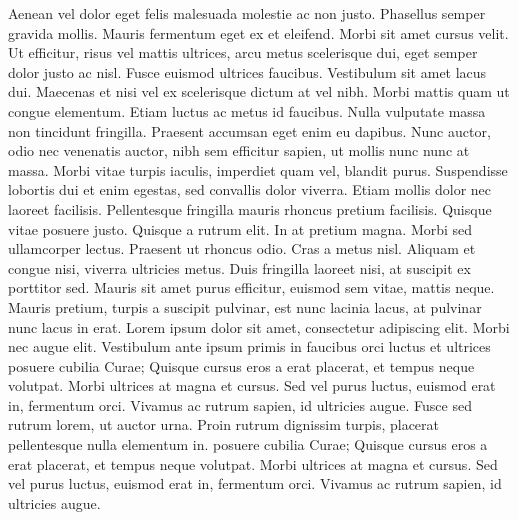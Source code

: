 \documentclass[twoside]{article}
\begin{document}
\autoversenumber Aenean vel dolor eget felis malesuada molestie ac non justo.
\autoversenumber Phasellus semper gravida mollis.
\autoversenumber Mauris fermentum eget ex et eleifend.
\autoversenumber Morbi sit amet cursus velit.
\autoversenumber Ut efficitur, risus vel mattis ultrices, arcu metus scelerisque dui, eget semper dolor justo ac nisl.
\autoversenumber Fusce euismod ultrices faucibus.
\autoversenumber Vestibulum sit amet lacus dui.
\autoversenumber Maecenas et nisi vel ex scelerisque dictum at vel nibh.
\autoversenumber Morbi mattis quam ut congue elementum.
\autoversenumber Etiam luctus ac metus id faucibus.
\autoversenumber Nulla vulputate massa non tincidunt fringilla.
\autoversenumber Praesent accumsan eget enim eu dapibus.
\autoversenumber Nunc auctor, odio nec venenatis auctor, nibh sem efficitur sapien, ut mollis nunc nunc at massa.
\autoversenumber Morbi vitae turpis iaculis, imperdiet quam vel, blandit purus.
\autoversenumber Suspendisse lobortis dui et enim egestas, sed convallis dolor viverra.
\autoversenumber Etiam mollis dolor nec laoreet facilisis.
\autoversenumber Pellentesque fringilla mauris rhoncus pretium facilisis.
\autoversenumber Quisque vitae posuere justo.
\autoversenumber Quisque a rutrum elit.
\autoversenumber In at pretium magna.
\autoversenumber Morbi sed ullamcorper lectus.
\autoversenumber Praesent ut rhoncus odio.
\autoversenumber Cras a metus nisl.
\autoversenumber Aliquam et congue nisi, viverra ultricies metus.
\autoversenumber Duis fringilla laoreet nisi, at suscipit ex porttitor sed.
\autoversenumber Mauris sit amet purus efficitur, euismod sem vitae, mattis neque.
\autoversenumber Mauris pretium, turpis a suscipit pulvinar, est nunc lacinia lacus, at pulvinar nunc lacus in erat.
\autoversenumber Lorem ipsum dolor sit amet, consectetur adipiscing elit.
\autoversenumber Morbi nec augue elit.
\autoversenumber Vestibulum ante ipsum primis in faucibus orci luctus et ultrices posuere cubilia Curae; Quisque cursus eros a erat placerat, et tempus neque volutpat.
\autoversenumber Morbi ultrices at magna et cursus.
\autoversenumber Sed vel purus luctus, euismod erat in, fermentum orci.
\autoversenumber Vivamus ac rutrum sapien, id ultricies augue.
\autoversenumber Fusce sed rutrum lorem, ut auctor urna.
\autoversenumber Proin rutrum dignissim turpis, placerat pellentesque nulla elementum in.
\autoversenumber posuere cubilia Curae; Quisque cursus eros a erat placerat, et tempus neque volutpat.
\autoversenumber Morbi ultrices at magna et cursus.
\autoversenumber Sed vel purus luctus, euismod erat in, fermentum orci.
\autoversenumber Vivamus ac rutrum sapien, id ultricies augue.
\end{document}
